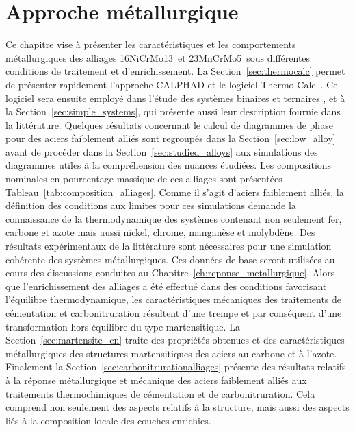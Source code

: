 \chapter{Approche métallurgique }
\label{ch:thermodynamique}

\vfill

Ce chapitre vise à présenter les caractéristiques et les comportements métallurgiques des alliages 16NiCrMo13 et 23MnCrMo5 sous différentes conditions de traitement et d'enrichissement. La Section~\ref{sec:thermocalc} permet de présenter rapidement l'approche CALPHAD et le logiciel Thermo-Calc~\cite{Andersson2002,Borgenstam2000}. Ce logiciel sera ensuite employé dans l'étude des systèmes binaires et ternaires ,  et  à la Section~\ref{sec:simple_systems}, qui présente aussi leur description fournie dans la littérature. Quelques résultats concernant le calcul de diagrammes de phase pour des aciers faiblement alliés sont regroupés dans la Section~\ref{sec:low_alloy} avant de procéder dans la Section~\ref{sec:studied_alloys} aux simulations des diagrammes utiles à la compréhension des nuances étudiées. Les compositions nominales en pourcentage massique de ces alliages sont présentées Tableau~\ref{tab:composition_alliages}. Comme il s'agit d'aciers faiblement alliés, la définition des conditions aux limites pour ces simulations demande la connaissance de la thermodynamique des systèmes contenant non seulement fer, carbone et azote mais aussi nickel, chrome, manganèse et molybdène. Des résultats expérimentaux de la littérature sont nécessaires pour une simulation cohérente des systèmes métallurgiques. Ces données de base seront utilisées au cours des discussions conduites au Chapitre~\ref{ch:reponse_metallurgique}. Alors que l'enrichissement des alliages a été effectué dans des conditions favorisant l'équilibre thermodynamique, les caractéristiques mécaniques des traitements de cémentation et carbonitruration résultent d'une trempe et par conséquent d'une transformation hors équilibre du type martensitique. La Section~\ref{sec:martensite_cn} traite des propriétés obtenues et des caractéristiques métallurgiques des structures martensitiques des aciers au carbone et à l'azote. Finalement la Section~\ref{sec:carbonitrurationalliages} présente des résultats relatifs à la réponse métallurgique et mécanique des aciers faiblement alliés aux traitements thermochimiques de cémentation et de carbonitruration. Cela comprend non seulement des aspects relatifs à la structure, mais aussi des aspects liés à la composition locale des couches enrichies.

